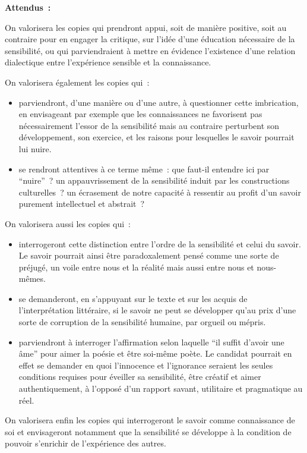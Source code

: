 {\textbf{Attendus~:}

On valorisera les copies qui prendront appui, soit de manière positive, soit au
contraire pour en engager la critique, sur l'idée d'une éducation nécessaire de la
sensibilité, ou qui parviendraient à mettre en évidence l'existence d'une relation
dialectique entre l'expérience sensible et la connaissance.

On valorisera également les copies qui~:

\begin{itemize}
\item parviendront, d'une manière ou d'une autre, à questionner cette imbrication,
en envisageant par exemple que les connaissances ne favorisent pas
nécessairement l'essor de la sensibilité mais au contraire perturbent son
développement, son exercice, et les raisons pour lesquelles le savoir
pourrait lui nuire.

\item se rendront attentives à ce terme même~: que faut-il entendre ici par “nuire”~?
un appauvrissement de la sensibilité induit par les constructions culturelles~?
un écrasement de notre capacité à ressentir au profit d'un savoir purement
intellectuel et abstrait~?
\end{itemize}

On valorisera aussi les copies qui~:

\begin{itemize}
\item interrogeront cette distinction entre l'ordre de la sensibilité et celui du savoir.
Le savoir pourrait ainsi être paradoxalement pensé comme une sorte de
préjugé, un voile entre nous et la réalité mais aussi entre nous et nous-
mêmes.
\item se demanderont, en s'appuyant sur le texte et sur les acquis de
l'interprétation littéraire, si le savoir ne peut se développer qu'au prix d'une
sorte de corruption de la sensibilité humaine, par orgueil ou mépris.
\item parviendront à interroger l'affirmation selon laquelle “il suffit d'avoir une âme”
pour aimer la poésie et être soi-même poète. Le candidat pourrait en effet
se demander en quoi l'innocence et l'ignorance seraient les seules
conditions requises pour éveiller sa sensibilité, être créatif et aimer
authentiquement, à l'opposé d'un rapport savant, utilitaire et pragmatique au
réel.
\end{itemize}

On valorisera enfin les copies qui interrogeront le savoir comme connaissance
de soi et envisageront notamment que la sensibilité se développe à la condition de
pouvoir s'enrichir de l'expérience des autres.}

